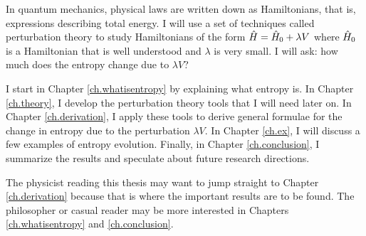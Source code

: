 
In quantum mechanics, physical laws are written down as Hamiltonians, that is, expressions describing total energy. I will use a set of techniques called perturbation theory to study Hamiltonians of the form \(\hat{H} = \hat{H}_0 + \lambda V\) where \(\hat{H}_0\) is a Hamiltonian that is well understood and \(\lambda\) is very small. I will ask: how much does the entropy change due to \(\lambda V\)?

I start in Chapter \ref{ch.whatisentropy} by explaining what entropy is. In Chapter \ref{ch.theory}, I develop the perturbation theory tools that I will need later on. In Chapter \ref{ch.derivation}, I apply these tools to derive general formulae for the change in entropy due to the perturbation \(\lambda V\). In Chapter \ref{ch.ex}, I will discuss a few examples of entropy evolution. Finally, in Chapter \ref{ch.conclusion}, I summarize the results and speculate about future research directions.

The physicist reading this thesis may want to jump straight to Chapter \ref{ch.derivation} because that is where the important results are to be found. The philosopher or casual reader may be more interested in Chapters \ref{ch.whatisentropy} and \ref{ch.conclusion}.
